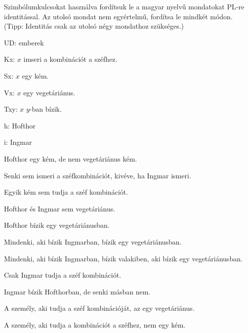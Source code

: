 \problempart
Szimbólumkulcsokat használva fordítsuk le a magyar nyelvű mondatokat PL-re identitással. Az utolsó mondat nem egyértelmű, fordítsa le mindkét módon. (Tipp: Identitás csak az utolsó négy mondathoz szükséges.)
\begin{ekey}
\item[UD:] emberek
\item[Kx:] $x$ imseri a kombinációt a széfhez.
\item[Sx:] $x$ egy kém.
\item[Vx:] $x$ egy vegetáriánus.
\item[Txy:] $x$ $y$-ban bízik.
\item[h:] Hofthor
\item[i:] Ingmar
\end{ekey}
\begin{earg}
\item Hofthor egy kém, de nem vegetáriánus kém.
\item Senki sem ismeri a széfkombinációt, kivéve, ha Ingmar ismeri.
\item Egyik kém sem tudja a széf kombinációt.
\item Hofthor és Ingmar sem vegetáriánus.
\item Hofthor bízik egy vegetáriánusban.
\item Mindenki, aki bízik Ingmarban, bízik egy vegetáriánusban.
\item Mindenki, aki bízik Ingmarban, bízik valakiben, aki bízik egy vegetáriánusban.
\item Csak Ingmar tudja a széf kombinációt.
\item Ingmar bízik Hofthorban, de senki másban nem.
\item A személy, aki tudja a széf kombinációját, az egy vegetáriánus.
\item A személy, aki tudja a kombinációt a széfhez, nem egy kém.
\end{earg}


